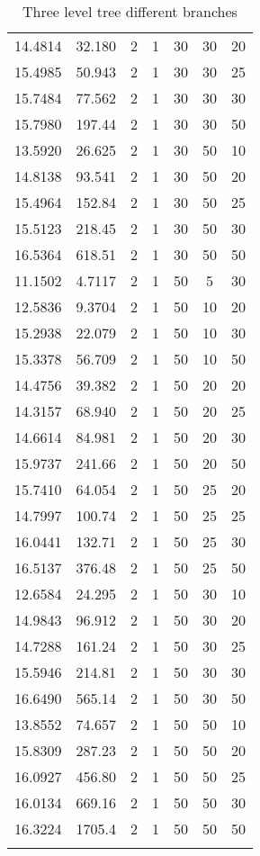 \documentclass[11pt]{article}
\begin{document}
\begin{center}
\begin{longtable}{rrccccc}
14.4814    & 32.180   &  2 & 1 &  30 & 30 & 20	\\ 
15.4985    & 50.943   &  2 & 1 &  30 & 30 & 25	\\ 
15.7484    & 77.562   &  2 & 1 &  30 & 30 & 30	\\ 
15.7980    & 197.44   &  2 & 1 &  30 & 30 & 50	\\ 
13.5920    & 26.625   &  2 & 1 &  30 & 50 & 10	\\ 
14.8138    & 93.541   &  2 & 1 &  30 & 50 & 20	\\ 
15.4964    & 152.84   &  2 & 1 &  30 & 50 & 25	\\ 
15.5123    & 218.45   &  2 & 1 &  30 & 50 & 30	\\ 
16.5364    & 618.51   &  2 & 1 &  30 & 50 & 50	\\ 
11.1502    & 4.7117   &  2 & 1 &  50 & 5  & 30 	\\ 
12.5836    & 9.3704   &  2 & 1 &  50 & 10 & 20	\\ 
15.2938    & 22.079   &  2 & 1 &  50 & 10 & 30	\\ 
15.3378    & 56.709   &  2 & 1 &  50 & 10 & 50	\\ 
14.4756    & 39.382   &  2 & 1 &  50 & 20 & 20	\\ 
14.3157    & 68.940   &  2 & 1 &  50 & 20 & 25	\\ 
14.6614    & 84.981   &  2 & 1 &  50 & 20 & 30	\\ 
15.9737    & 241.66   &  2 & 1 &  50 & 20 & 50	\\ 
15.7410    & 64.054   &  2 & 1 &  50 & 25 & 20	\\ 
14.7997    & 100.74   &  2 & 1 &  50 & 25 & 25	\\ 
16.0441    & 132.71   &  2 & 1 &  50 & 25 & 30	\\ 
16.5137    & 376.48   &  2 & 1 &  50 & 25 & 50	\\ 
12.6584    & 24.295   &  2 & 1 &  50 & 30 & 10	\\ 
14.9843    & 96.912   &  2 & 1 &  50 & 30 & 20	\\ 
14.7288    & 161.24   &  2 & 1 &  50 & 30 & 25	\\ 
15.5946    & 214.81   &  2 & 1 &  50 & 30 & 30	\\ 
16.6490    & 565.14   &  2 & 1 &  50 & 30 & 50	\\ 
13.8552    & 74.657   &  2 & 1 &  50 & 50 & 10	\\ 
15.8309    & 287.23   &  2 & 1 &  50 & 50 & 20	\\ 
16.0927    & 456.80   &  2 & 1 &  50 & 50 & 25	\\ 
16.0134    & 669.16   &  2 & 1 &  50 & 50 & 30	\\ 
16.3224    & 1705.4   &  2 & 1 &  50 & 50 & 50	\\ 

    \caption{Three level tree different branches}
\end{longtable}
\end{center}



 
\end{document}
